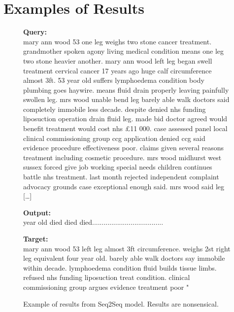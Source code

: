 \setcounter{topnumber}{8}
\setcounter{bottomnumber}{8}
\setcounter{totalnumber}{8}
\section{Examples of Results}
\label{appendixa}


\newcommand{\boxbox}[3]{\colorbox{#1}{\parbox{\textwidth}{\textbf{#2} \\ #3}}}

\begin{figure}[H]
	\tiny
	\sffamily
	\boxbox{queryc}{Query:}{mary ann wood 53 one leg weighs two stone cancer treatment. grandmother spoken agony living medical condition means one leg two stone heavier another. mary ann wood left leg began swell treatment cervical cancer 17 years ago huge calf circumference almost 3ft. 53 year old suffers lymphoedema condition body plumbing goes haywire. means fluid drain properly leaving painfully swollen leg. mrs wood unable bend leg barely able walk doctors said completely immobile less decade. despite denied nhs funding liposuction operation drain fluid leg. made bid doctor agreed would benefit treatment would cost nhs £11 000. case assessed panel local clinical commissioning group ccg application denied ccg said evidence procedure effectiveness poor. claims given several reasons treatment including cosmetic procedure. mrs wood midhurst west sussex forced give job working special needs children continues battle nhs treatment. last month rejected independent complaint advocacy grounds case exceptional enough said. mrs wood said leg [\dots{}]}
	\boxbox{outputc}{Output:}{year old died died died.....................................}
	\boxbox{targetc}{Target:}{mary ann wood 53 left leg almost 3ft circumference. weighs 2st right leg equivalent four year old. barely able walk doctors say immobile within decade. lymphoedema condition fluid builds tissue limbs. refused nhs funding liposuction treat condition. clinical commissioning group argues evidence treatment poor "}
	\caption{Example of results from Seq2Seq model. Results are nonsensical.}
	\label{seq2seq_example}
\end{figure}

